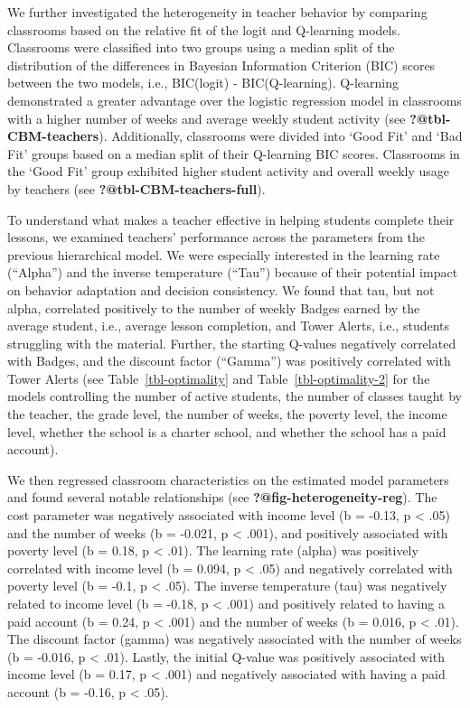 \documentclass[
  number,
  preprint,
  3p,
  onecolumn]{elsarticle}
\begin{document}
We further investigated the heterogeneity in teacher behavior by
comparing classrooms based on the relative fit of the logit and
Q-learning models. Classrooms were classified into two groups using a
median split of the distribution of the differences in Bayesian
Information Criterion (BIC) scores between the two models, i.e.,
BIC(logit) - BIC(Q-learning). Q-learning demonstrated a greater
advantage over the logistic regression model in classrooms with a higher
number of weeks and average weekly student activity (see
\textbf{?@tbl-CBM-teachers}). Additionally, classrooms were divided into
`Good Fit' and `Bad Fit' groups based on a median split of their
Q-learning BIC scores. Classrooms in the `Good Fit' group exhibited
higher student activity and overall weekly usage by teachers (see
\textbf{?@tbl-CBM-teachers-full}).

To understand what makes a teacher effective in helping students
complete their lessons, we examined teachers' performance across the
parameters from the previous hierarchical model. We were especially
interested in the learning rate (``Alpha'') and the inverse temperature
(``Tau'') because of their potential impact on behavior adaptation and
decision consistency. We found that tau, but not alpha, correlated
positively to the number of weekly Badges earned by the average student,
i.e., average lesson completion, and Tower Alerts, i.e., students
struggling with the material. Further, the starting Q-values negatively
correlated with Badges, and the discount factor (``Gamma'') was
positively correlated with Tower Alerts (see Table~\ref{tbl-optimality}
and Table~\ref{tbl-optimality-2} for the models controlling the number
of active students, the number of classes taught by the teacher, the
grade level, the number of weeks, the poverty level, the income level,
whether the school is a charter school, and whether the school has a
paid account).

We then regressed classroom characteristics on the estimated model
parameters and found several notable relationships (see
\textbf{?@fig-heterogeneity-reg}). The cost parameter was negatively
associated with income level (b = -0.13, p \textless{} .05) and the
number of weeks (b = -0.021, p \textless{} .001), and positively
associated with poverty level (b = 0.18, p \textless{} .01). The
learning rate (alpha) was positively correlated with income level (b =
0.094, p \textless{} .05) and negatively correlated with poverty level
(b = -0.1, p \textless{} .05). The inverse temperature (tau) was
negatively related to income level (b = -0.18, p \textless{} .001) and
positively related to having a paid account (b = 0.24, p \textless{}
.001) and the number of weeks (b = 0.016, p \textless{} .01). The
discount factor (gamma) was negatively associated with the number of
weeks (b = -0.016, p \textless{} .01). Lastly, the initial Q-value was
positively associated with income level (b = 0.17, p \textless{} .001)
and negatively associated with having a paid account (b = -0.16, p
\textless{} .05).
\end{document}
